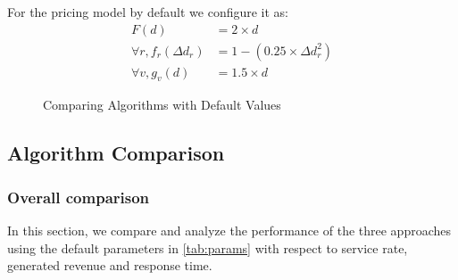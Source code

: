 For the pricing model by default we configure it as:
\vspace{-2mm}
\begin{equation} \label{eq1}
	\begin{split}
		F(d) & = 2 \times d \\
		\forall r, f_r(\Delta d_r) & = 1 - (0.25 \times \Delta d_r^2) \\
		\forall v, g_v(d)  & = 1.5 \times d
	\end{split}
\end{equation}
\vspace{-5mm}

\begin{figure}[]
    \centering
    \vspace{-0.15in}
    \caption{Comparing Algorithms with Default Values}
    \vspace{-5mm}
    \label{fig:defaults}
\end{figure}

\subsection{Algorithm Comparison}

\subsubsection{Overall comparison}
In this section, we compare and analyze the performance of the three approaches using the default parameters in \cref{tab:params} with respect to service rate, generated revenue and response time.

